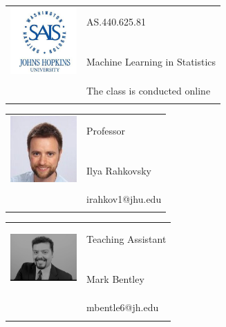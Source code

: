 \documentclass[11pt]{article}
\begin{document}
\begin{tabular}{ l l }
  \multirow{3}{*}{\includegraphics[height=1in,width=1in]{sais-logo.jpg}}  & \LARGE AS.440.625.81 \\\\
  & \LARGE  Machine Learning in Statistics \\\\
  & \LARGE The class is conducted online \\\\
\end{tabular}
\vspace{10mm}


\begin{tabular}{ l l }
  \multirow{3}{*}{\includegraphics[height=1in,width=1in]{ilya_pic.jpg}}  & \large Professor \\\\
  & \large Ilya Rahkovsky \\\\
  & \large irahkov1@jhu.edu \\\\
\end{tabular}
\vspace{10mm}

\begin{tabular}{ l l }
  \multirow{3}{*}{\includegraphics[height=1in,width=1in]{LinkedIn_Profile_Pic_3.png}}  & \large Teaching Assistant \\\\
  & \large Mark Bentley \\\\
  & \large mbentle6@jh.edu \\\\
\end{tabular}
\end{document}
